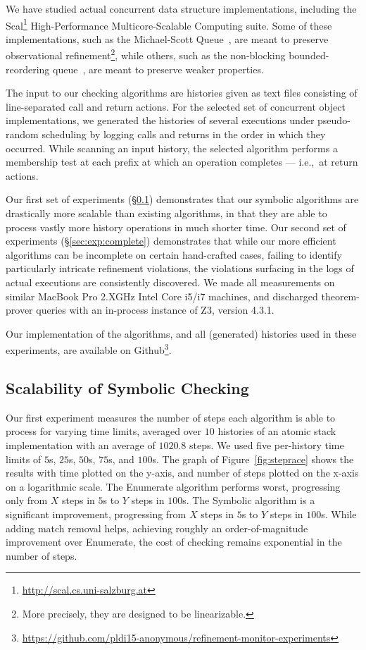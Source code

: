 We have studied actual concurrent data structure implementations, including the
Scal\footnote{\url{http://scal.cs.uni-salzburg.at}} High-Performance
Multicore-Scalable Computing suite. Some of these implementations, such as the
Michael-Scott Queue~\cite{conf/podc/MichaelS96}, are meant to preserve
observational refinement\footnote{More precisely, they are designed to be
linearizable.}, while others, such as the non-blocking bounded-reordering
queue~\cite{conf/pact/KirschLP13}, are meant to preserve weaker properties.

The input to our checking algorithms are histories given as text files
consisting of line-separated call and return actions. For the selected set of
concurrent object implementations, we generated the histories of several
executions under pseudo-random scheduling by logging calls and returns in the
order in which they occurred. While scanning an input history, the selected
algorithm performs a membership test at each prefix at which an operation
completes --- i.e.,~at return actions.

Our first set of experiments (\S\ref{sec:exp:scalable}) demonstrates that our
symbolic algorithms are drastically more scalable than existing algorithms, in
that they are able to process vastly more history operations in much shorter
time. Our second set of experiments (\S\ref{sec:exp:complete}) demonstrates
that while our more efficient algorithms can be incomplete on certain
hand-crafted cases, failing to identify particularly intricate refinement
violations, the violations surfacing in the logs of actual executions are
consistently discovered. We made all measurements on similar MacBook Pro
2.XGHz Intel Core i5/i7 machines, and discharged theorem-prover queries with
an in-process instance of Z3, version 4.3.1.

Our implementation of the algorithms, and all (generated) histories used in
these experiments, are available on
Github\footnote{\url{https://github.com/pldi15-anonymous/refinement-monitor-experiments}}.

\subsection{Scalability of Symbolic Checking}
\label{sec:exp:scalable}

Our first experiment measures the number of steps each algorithm is able to
process for varying time limits, averaged over $10$ histories of an atomic
stack implementation with an average of $1020.8$ steps. We used five
per-history time limits of $5$s, $25$s, $50$s, $75$s, and $100$s. The graph of
Figure~\ref{fig:steprace} shows the results with time plotted on the y-axis,
and number of steps plotted on the x-axis on a logarithmic scale. The {\sc
Enumerate} algorithm performs worst, progressing only from $X$ steps in $5$s to
$Y$ steps in $100$s. The {\sc Symbolic} algorithm is a significant improvement,
progressing from $X$ steps in $5$s to $Y$ steps in $100$s. While adding match
removal helps, achieving roughly an order-of-magnitude improvement over {\sc
Enumerate}, the cost of checking remains exponential in the number of steps.

